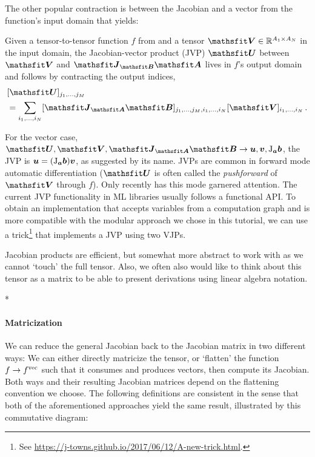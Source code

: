 The other popular contraction is between the Jacobian and a vector from the function's input domain that yields:

\begin{definition}\label{def:jvp}
  Given a tensor-to-tensor function $f$ from  and a tensor $\tV \in \sR^{A_1 \times A_N}$ in the input domain, the Jacobian-vector product (JVP) $\tU$ between $\tV$ and $\tJ_{\tB}\tA$ lives in $f$'s output domain and follows by contracting the output indices,
  \begin{align*}
     & [\tU]_{j_1, \dots, j_M}
    \\
     & =
    \sum_{i_1, \dots, i_N}
    [\tJ_{\tA}\tB]_{j_1, \dots, j_M, i_1, \dots, i_N}
    [\tV]_{i_1, \dots, i_N}\,.
  \end{align*}
\end{definition}
For the vector case, $\tU, \tV, \tJ_{\tA}\tB \to \vu, \vv, \jac_{\va}\vb$, the JVP is $\vu = (\jac_{\va}\vb) \vv$, as suggested by its name.
JVPs are common in forward mode automatic differentiation ($\tU$ is often called the \emph{pushforward} of $\tV$ through $f$).
Only recently has this mode garnered attention.
The current JVP functionality in ML libraries usually follows a functional API.
To obtain an implementation that accepts variables from a computation graph and is more compatible with the modular approach we chose in this tutorial, we can use a trick\footnote{See \url{https://j-towns.github.io/2017/06/12/A-new-trick.html}.} that implements a JVP using two VJPs.

Jacobian products are efficient, but somewhat more abstract to work with as we cannot `touch' the full tensor. Also, we often also would like to think about this tensor as a matrix to be able to present derivations using linear algebra notation.

\switchcolumn[1]*
\switchcolumn[0]

\paragraph{Matricization} We can reduce the general Jacobian back to the Jacobian matrix in two different ways: We can either directly matricize the tensor, or `flatten' the function $f \to f^{\vec}$ such that it consumes and produces vectors, then compute its Jacobian.
Both ways and their resulting Jacobian matrices depend on the flattening convention we choose.
The following definitions are consistent in the sense that both of the aforementioned approaches yield the same result, illustrated by this commutative diagram:

